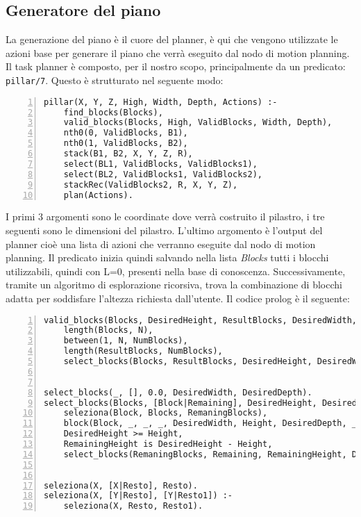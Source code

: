 \subsection{Generatore del piano}
\label{subsec:generatorepiano}
La generazione del piano è il cuore del planner, è qui che vengono utilizzate le azioni base per generare il piano che verrà eseguito dal nodo di motion planning. Il task planner è composto, per il nostro scopo, principalmente da un predicato: \verb+pillar/7+.
Questo è strutturato nel seguente modo:
\begin{Verbatim}[numbers=left]
pillar(X, Y, Z, High, Width, Depth, Actions) :-
    find_blocks(Blocks),
    valid_blocks(Blocks, High, ValidBlocks, Width, Depth),
    nth0(0, ValidBlocks, B1),
    nth0(1, ValidBlocks, B2),
    stack(B1, B2, X, Y, Z, R),
    select(BL1, ValidBlocks, ValidBlocks1),
    select(BL2, ValidBlocks1, ValidBlocks2),
    stackRec(ValidBlocks2, R, X, Y, Z),
    plan(Actions).
\end{Verbatim}
I primi 3 argomenti sono le coordinate dove verrà costruito il pilastro, i tre seguenti sono le dimensioni del pilastro. L'ultimo argomento è l'output del planner cioè una lista di azioni che verranno eseguite dal nodo di motion planning.
Il predicato inizia quindi salvando nella lista \textit{Blocks} tutti i blocchi utilizzabili, quindi con L=0, presenti nella base di conoscenza.
Successivamente, tramite un algoritmo di esplorazione ricorsiva, trova la combinazione di blocchi adatta per soddisfare l'altezza richiesta dall'utente. Il codice prolog è il seguente:
\begin{Verbatim}[numbers=left]
valid_blocks(Blocks, DesiredHeight, ResultBlocks, DesiredWidth, DesiredDepth) :-
    length(Blocks, N),               
    between(1, N, NumBlocks),        
    length(ResultBlocks, NumBlocks),  
    select_blocks(Blocks, ResultBlocks, DesiredHeight, DesiredWidth, DesiredDepth). 


select_blocks(_, [], 0.0, DesiredWidth, DesiredDepth). 
select_blocks(Blocks, [Block|Remaining], DesiredHeight, DesiredWidth, DesiredDepth) :-
    seleziona(Block, Blocks, RemaningBlocks), 
    block(Block, _, _, _, DesiredWidth, Height, DesiredDepth, _, _, _, _, _, _), 
    DesiredHeight >= Height,                
    RemainingHeight is DesiredHeight - Height,
    select_blocks(RemaningBlocks, Remaining, RemainingHeight, DesiredWidth, DesiredDepth). 


seleziona(X, [X|Resto], Resto).
seleziona(X, [Y|Resto], [Y|Resto1]) :-
    seleziona(X, Resto, Resto1).
\end{Verbatim}
